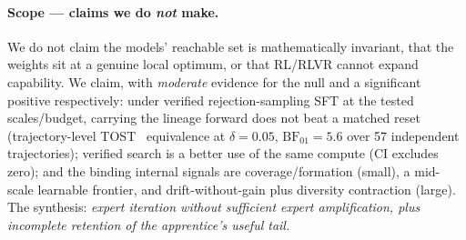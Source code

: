 \paragraph{Scope --- claims we do \emph{not} make.} We do not claim the models' reachable set is mathematically
invariant, that the weights sit at a genuine local optimum, or that RL/RLVR cannot expand capability. We claim,
with \emph{moderate} evidence for the null and a significant positive respectively: under verified
rejection-sampling SFT at the tested scales/budget, carrying the lineage forward does not beat a matched reset
(trajectory-level TOST~\cite{schuirmann1987tost} equivalence at $\delta{=}0.05$, $\mathrm{BF}_{01}{=}5.6$ over 57 independent
trajectories); verified search is a better use of the same compute (CI excludes zero); and the binding internal signals are coverage/formation (small), a mid-scale learnable
frontier, and drift-without-gain plus diversity contraction (large). The synthesis: \emph{expert iteration
without sufficient expert amplification, plus incomplete retention of the apprentice's useful tail.}
